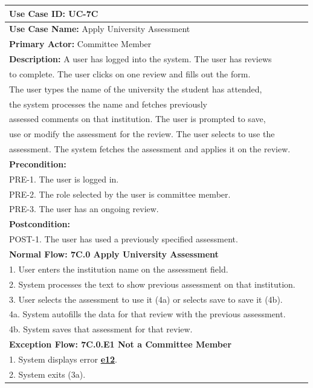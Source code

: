 \documentclass[fontsize=12pt,paper=letter,twoside]{scrartcl}
\begin{document}
\begin{table}[!htb]
\begin{center}
\begin{tabular}{|l|l|}
\hline
\textbf{Use Case ID:} UC-7C \\ \hline
\textbf{Use Case Name:} Apply University Assessment \\ \hline
\textbf {Primary Actor:} Committee Member \\ \hline
\textbf{Description:} A user has logged into the system. The user has reviews \\to complete. The user clicks on one review and fills out the form.\\The user types the name of the university the student has attended,\\the system processes the name and fetches previously \\assessed comments on that institution. The user is prompted to save, \\use or modify the assessment for the review. The user selects to use the\\assessment. The system fetches the assessment and applies it on the review.\\ \hline
\textbf{Precondition:}
\\ PRE-1. The user is logged in.
\\ PRE-2. The role selected by the user is committee member.
\\ PRE-3. The user has an ongoing review.\\ \hline
\textbf{Postcondition:}
\\ POST-1. The user has used a previously specified assessment. \\ \hline
\textbf{Normal Flow: 7C.0 Apply University Assessment}
\\ 1. User enters the institution name on the assessment field.
\\ 2. System processes the text to show previous assessment on that institution.
\\ 3. User selects the assessment to use it (4a) or selects save to save it (4b).
\\ 4a. System autofills the data for that review with the previous assessment.
\\ 4b. System saves that assessment for that review.\\ \hline
\textbf{Exception Flow: 7C.0.E1 Not a Committee Member}
\\ 1. System displays error  \hyperref[app:error]{\textbf{e12}}.
\\ 2. System exits (3a). \\ \hline 

\end{tabular}
\end{center}
\end{table}
\end{document}
